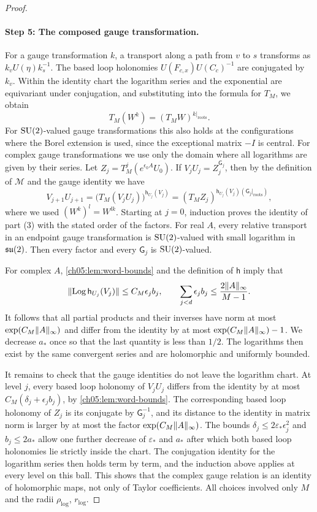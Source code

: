 \begin{proof}
\paragraph{Step 5: The composed gauge transformation.}
For a gauge transformation $k$, a transport along a path from $v$ to $s$ transforms as $k_vU(\eta)k_s^{-1}$. The based loop holonomies $U(F_{c,x})U(C_c)^{-1}$ are conjugated by $k_v$. Within the identity chart the logarithm series and the exponential are equivariant under conjugation, and substituting into the formula for $T_M$, we obtain
\[
 T_M(W^k)=(T_MW)^{k|_{\mathrm{roots}}}.
\]
For $\mathrm{SU}(2)$-valued gauge transformations this also holds at the configurations where the Borel extension is used, since the exceptional matrix $-I$ is central. For complex gauge transformations we use only the domain where all logarithms are given by their series. Let $Z_j=T_M^j(e^{\epsilon_0A}U_0)$. If $V_jU_j=Z_j^{\mathsf G_j}$, then by the definition of $\mathscr M$ and the gauge identity we have
\[
 V_{j+1}U_{j+1}=\bigl(T_M(V_jU_j)\bigr)^{\mathsf h_{U_j}(V_j)}=(T_MZ_j)^{\mathsf h_{U_j}(V_j)(\mathsf G_j|_{\mathrm{roots}})},
\]
where we used $(W^k)^l=W^{lk}$. Starting at $j=0$, induction proves the identity of part (3) with the stated order of the factors. For real $A$, every relative transport in an endpoint gauge transformation is $\mathrm{SU}(2)$-valued with small logarithm in $\mathfrak{su}(2)$. Then every factor and every $\mathsf G_j$ is $\mathrm{SU}(2)$-valued.

For complex $A$, \cref{ch05:lem:word-bounds} and the definition of $\mathsf h$ imply that
\[
 \lVert \operatorname{Log}\mathsf h_{U_j}(V_j)\rVert\le C_M\epsilon_jb_j,\qquad\sum_{j<d}\epsilon_jb_j\le\frac{2\lVert A\rVert_\infty}{M-1}.
\]
It follows that all partial products and their inverses have norm at most $\exp(C_M\lVert A\rVert_\infty)$ and differ from the identity by at most $\exp(C_M\lVert A\rVert_\infty)-1$. We decrease $a_*$ once so that the last quantity is less than $1/2$. The logarithms then exist by the same convergent series and are holomorphic and uniformly bounded.

It remains to check that the gauge identities do not leave the logarithm chart. At level $j$, every based loop holonomy of $V_jU_j$ differs from the identity by at most $C_M(\delta_j+\epsilon_jb_j)$, by \cref{ch05:lem:word-bounds}. The corresponding based loop holonomy of $Z_j$ is its conjugate by $\mathsf G_j^{-1}$, and its distance to the identity in matrix norm is larger by at most the factor $\exp(C_M\lVert A\rVert_\infty)$. The bounds $\delta_j\le2\varepsilon_*\epsilon_j^2$ and $b_j\le2a_*$ allow one further decrease of $\varepsilon_*$ and $a_*$ after which both based loop holonomies lie strictly inside the chart. The conjugation identity for the logarithm series then holds term by term, and the induction above applies at every level on this ball. This shows that the complex gauge relation is an identity of holomorphic maps, not only of Taylor coefficients. All choices involved only $M$ and the radii $\rho_{\log}$, $r_{\log}$.
\end{proof}

